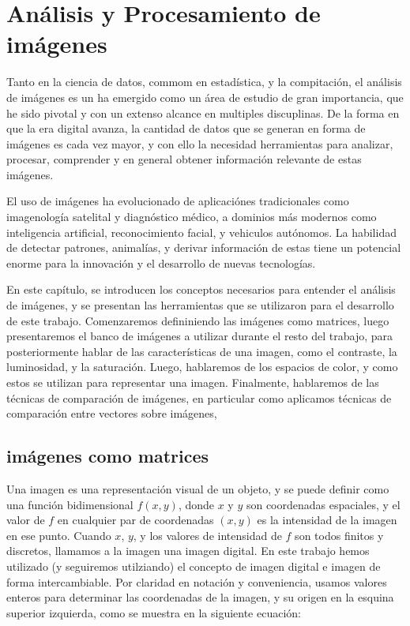 \chapter{Análisis y Procesamiento de im\'agenes }\label{chap3}


Tanto en la ciencia de datos, commom en estad\'istica, y la compitaci\'on, el an\'alisis de im\'agenes es un ha emergido como un \'area de estudio de gran importancia, que he sido pivotal y con un extenso alcance en multiples discuplinas. De la forma en que la era digital avanza, la cantidad de datos que se generan en forma de im\'agenes es cada vez mayor, y con ello la necesidad herramientas para analizar, procesar, comprender y en general obtener informaci\'on relevante de estas im\'agenes. 

El uso de im\'agenes ha evolucionado de aplicaci\'ones tradicionales como imagenolog\'ia satelital y diagn\'ostico m\'edico, a dominios m\'as modernos como inteligencia artificial, reconocimiento facial, y vehiculos aut\'onomos. La habilidad de detectar patrones, animal\'ias, y derivar informaci\'on de estas tiene un potencial enorme para la innovaci\'on y el desarrollo de nuevas tecnolog\'ias. 

En este cap\'itulo, se introducen los conceptos necesarios para entender el an\'alisis de im\'agenes, y se presentan las herramientas que se utilizaron para el desarrollo de este trabajo. Comenzaremos defininiendo las im\'agenes como matrices, luego presentaremos el banco de im\'agenes a utilizar durante el resto del trabajo, para posteriormente hablar de las caracter\'isticas de una imagen, como el contraste, la luminosidad, y la saturaci\'on. Luego, hablaremos de los espacios de color, y como estos se utilizan para representar una imagen. Finalmente, hablaremos de las t\'ecnicas de comparaci\'on de im\'agenes, en particular como aplicamos t\'ecnicas de comparaci\'on entre vectores sobre im\'agenes,

\section{im\'agenes como matrices}

Una imagen es una representaci\'on visual de un objeto, y se puede definir como una funci\'on bidimensional $f(x,y)$, donde $x$ y $y$ son coordenadas espaciales, y el valor de $f$ en cualquier par de coordenadas $(x,y)$ es la intensidad de la imagen en ese punto. Cuando $x$, $y$, y los valores de intensidad de $f$ son todos finitos y discretos, llamamos a la imagen una imagen digital. En este trabajo hemos utilizado (y seguiremos utilziando) el concepto de imagen digital e imagen de forma intercambiable. Por claridad en notaci\'on y conveniencia, usamos valores enteros para determinar las coordenadas de la imagen, y su origen en la esquina superior izquierda, como se muestra en la siguiente ecuaci\'on:

